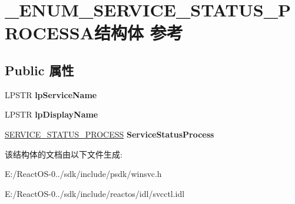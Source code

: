 \hypertarget{struct___e_n_u_m___s_e_r_v_i_c_e___s_t_a_t_u_s___p_r_o_c_e_s_s_a}{}\section{\+\_\+\+E\+N\+U\+M\+\_\+\+S\+E\+R\+V\+I\+C\+E\+\_\+\+S\+T\+A\+T\+U\+S\+\_\+\+P\+R\+O\+C\+E\+S\+S\+A结构体 参考}
\label{struct___e_n_u_m___s_e_r_v_i_c_e___s_t_a_t_u_s___p_r_o_c_e_s_s_a}
\subsection*{Public 属性}
\begin{DoxyCompactItemize}
\item 
\mbox{\label{struct___e_n_u_m___s_e_r_v_i_c_e___s_t_a_t_u_s___p_r_o_c_e_s_s_a_a4af43ec4d946475b2737108fed592826}} 
L\+P\+S\+TR {\bfseries lp\+Service\+Name}
\item 
\mbox{\label{struct___e_n_u_m___s_e_r_v_i_c_e___s_t_a_t_u_s___p_r_o_c_e_s_s_a_a396cbfaf3dce656f7134776ba3024ca3}} 
L\+P\+S\+TR {\bfseries lp\+Display\+Name}
\item 
\mbox{\label{struct___e_n_u_m___s_e_r_v_i_c_e___s_t_a_t_u_s___p_r_o_c_e_s_s_a_a776e9e7122de3611d9cf9193f864f4ab}} 
\hyperlink{struct___s_e_r_v_i_c_e___s_t_a_t_u_s___p_r_o_c_e_s_s}{S\+E\+R\+V\+I\+C\+E\+\_\+\+S\+T\+A\+T\+U\+S\+\_\+\+P\+R\+O\+C\+E\+SS} {\bfseries Service\+Status\+Process}
\end{DoxyCompactItemize}


该结构体的文档由以下文件生成\+:\begin{DoxyCompactItemize}
\item 
E\+:/\+React\+O\+S-\/0../sdk/include/psdk/winsvc.\+h\item 
E\+:/\+React\+O\+S-\/0../sdk/include/reactos/idl/svcctl.\+idl\end{DoxyCompactItemize}
